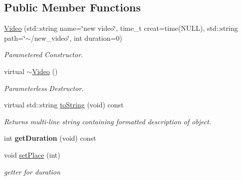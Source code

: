 \subsection*{Public Member Functions}
\begin{DoxyCompactItemize}
\item 
\hypertarget{classVideo_ad0277d8e5772008e22ac2948e03e103b}{\hyperlink{classVideo_ad0277d8e5772008e22ac2948e03e103b}{Video} (std\-::string name=\char`\"{}new video\char`\"{}, time\-\_\-t creat=time(N\-U\-L\-L), std\-::string path=\char`\"{}$\sim$/new\-\_\-video\char`\"{}, int duration=0)}\label{classVideo_ad0277d8e5772008e22ac2948e03e103b}

\begin{DoxyCompactList}\small\item\em Parametered Constructor. \end{DoxyCompactList}\item 
virtual \hyperlink{classVideo_aebf7e2a8fa2bbd79335b1cf35925d190}{$\sim$\-Video} ()
\begin{DoxyCompactList}\small\item\em Parameterless Destructor. \end{DoxyCompactList}\item 
\hypertarget{classVideo_af09cd9142969d63b514a251769fbed86}{virtual std\-::string \hyperlink{classVideo_af09cd9142969d63b514a251769fbed86}{to\-String} (void) const }\label{classVideo_af09cd9142969d63b514a251769fbed86}

\begin{DoxyCompactList}\small\item\em Returns multi-\/line string containing formatted description of object. \end{DoxyCompactList}\item 
\hypertarget{classVideo_a1a495dbb8b0389e092758c62144ebc45}{int {\bfseries get\-Duration} (void) const }\label{classVideo_a1a495dbb8b0389e092758c62144ebc45}

\item 
\hypertarget{classVideo_a5accd8b8a418f0216bf45659a8050d3d}{void \hyperlink{classVideo_a5accd8b8a418f0216bf45659a8050d3d}{set\-Place} (int)}\label{classVideo_a5accd8b8a418f0216bf45659a8050d3d}

\begin{DoxyCompactList}\small\item\em getter for duration \end{DoxyCompactList}\end{DoxyCompactItemize}


